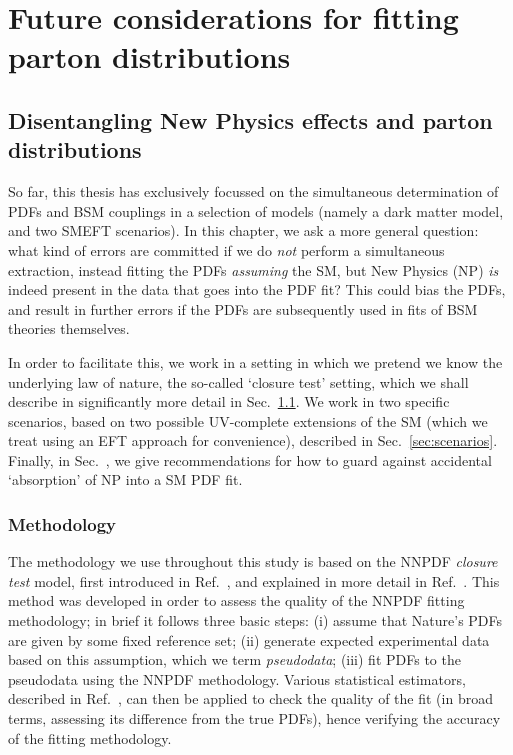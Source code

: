 \documentclass[withindex,glossary]{cam-thesis}
\begin{document}
\newpage
\part{Future considerations for fitting parton distributions}
\chapter{Disentangling New Physics effects and parton distributions}
\label{chap:contamination}

So far, this thesis has exclusively focussed on the simultaneous determination of PDFs
and BSM couplings in a selection of models (namely a dark matter model, and two SMEFT scenarios). 
In this chapter, we ask a more general question: what kind of errors are committed if we do \textit{not} 
perform a simultaneous extraction, instead fitting the PDFs \textit{assuming} the SM,
but New Physics (NP) \textit{is} indeed present in the data that goes into the PDF fit? This could bias the
PDFs, and result in further errors if the PDFs are subsequently used in fits of BSM theories themselves. 

In order to facilitate this, we work in a setting in which we pretend
we know the underlying law of nature, the so-called `closure test' setting, which we shall describe in 
significantly more detail in Sec.~\ref{sec:methodology}. We work in two specific scenarios, based 
on two possible UV-complete extensions of the SM (which we treat using an EFT approach for 
convenience), described in Sec.~\ref{sec:scenarios}. Finally, in Sec.~\ref{}, we give recommendations
for how to guard against accidental `absorption' of NP into a SM PDF fit.


\section{Methodology}
\label{sec:methodology}

The methodology we use throughout this study is based on the NNPDF \textit{closure test} model,
first introduced in Ref.~\cite{NNPDF:2014otw}, and explained in more detail in Ref.~\cite{DelDebbio:2021whr}.
This method was developed
in order to assess the quality of the NNPDF fitting methodology; in brief it follows three basic steps: (i) assume that Nature's PDFs
are given by some fixed reference set; (ii) generate expected experimental data based on this assumption, which we term \textit{pseudodata}; (iii) fit PDFs to the pseudodata using the NNPDF methodology. Various statistical estimators, described in Ref.~\cite{DelDebbio:2021whr}, can then be applied to 
check the quality of the fit (in broad terms, assessing its difference from the true PDFs), hence verifying the accuracy of the fitting methodology.
\end{document}
